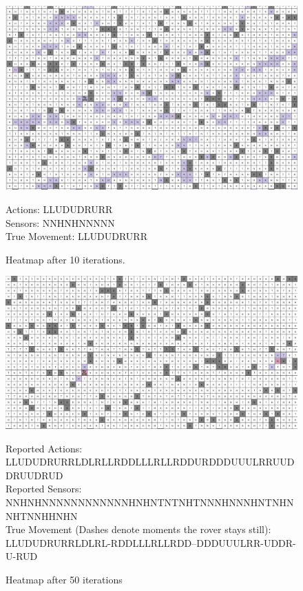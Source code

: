 \documentclass{article}
\begin{document}
        \begin{figure}[H]
            \centering
            \includegraphics[scale=0.3]{images/10iter.png}
            \caption{Heatmap after 10 iterations.}
            \label{fig:heatmap_10iter}
            \small
            Actions: LLUDUDRURR\\
            Sensors: NNHNHNNNNN\\
            True Movement: LLUDUDRURR
        \end{figure}
        
        \begin{figure}[H]
            \centering
            \includegraphics[scale=0.3]{images/50iter.png}
            \caption{Heatmap after 50 iterations}
            \label{fig:heatmap_50iter}
                    \small
                    Reported Actions:\\ LLUDUDRURRLDLRLLRDDLLLRLLRDDURDDDUUULRRUUDDRUUDRUD\\
                    Reported Sensors:\\ NNHNHNNNNNNNNNNNNHNHNTNTNHTNNNHNNNHNTNHNNHTNNHHNHN\\
                    True Movement (Dashes denote moments the rover stays still):\\
                        LLUDUDRURRLDLRL-RDDLLLRLLRDD--DDDUUULRR-UDDR-U-RUD
        \end{figure}
        
\end{document}
